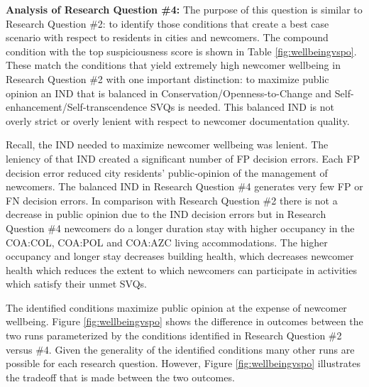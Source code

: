 \documentclass{scspaperproc}
\theoremstyle{scsthe}
\begin{document}
{\bf Analysis of Research Question \#4:} The purpose of this question is similar to Research Question \#2: to identify those conditions that create a best case scenario with respect to residents in cities and newcomers. The compound condition with the top suspiciousness score is shown in Table \ref{fig:wellbeingvspo}. These match the conditions that yield extremely high newcomer wellbeing in Research Question \#2 with one important distinction: to maximize public opinion an IND that is balanced in Conservation/Openness-to-Change and Self-enhancement/Self-transcendence SVQs is needed. This balanced IND is not overly strict or overly lenient with respect to newcomer documentation quality. 

Recall, the IND needed to maximize newcomer wellbeing was lenient.  The leniency of that IND created a significant number of FP decision errors. Each FP decision error reduced city residents' public-opinion of the management of newcomers. The balanced IND in Research Question \#4 generates very few FP or FN decision errors. In comparison with Research Question \#2 there is not a decrease in public opinion due to the IND decision errors but in Research Question \#4 newcomers do a longer duration stay with higher occupancy in the COA:COL, COA:POL and COA:AZC living accommodations. The higher occupancy and longer stay decreases building health, which decreases newcomer health which reduces the extent to which newcomers can participate in activities which satisfy their unmet SVQs. 

The identified conditions maximize public opinion at the expense of newcomer wellbeing. Figure \ref{fig:wellbeingvspo} shows the difference in outcomes between the two runs parameterized by the conditions identified in Research Question \#2 versus \#4. Given the generality of the identified conditions many other runs are possible for each research question. However, Figure \ref{fig:wellbeingvspo} illustrates the tradeoff that is made between the two outcomes. 

\end{document}
